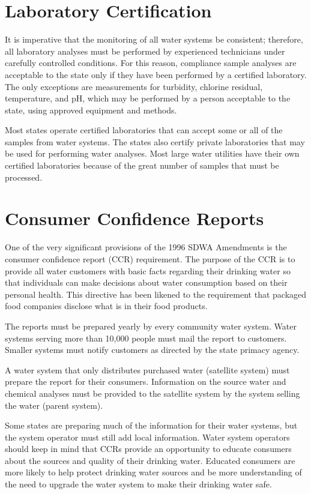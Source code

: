 \documentclass[10pt]{article}
\begin{document}
\section{Laboratory Certification}
It is imperative that the monitoring of all water systems be consistent; therefore, all laboratory analyses must be performed by experienced technicians under carefully controlled conditions. For this reason, compliance sample analyses are acceptable to the state only if they have been performed by a certified laboratory. The only exceptions are measurements for turbidity, chlorine residual, temperature, and $\mathrm{pH}$, which may be performed by a person acceptable to the state, using approved equipment and methods.

Most states operate certified laboratories that can accept some or all of the samples from water systems. The states also certify private laboratories that may be used for performing water analyses. Most large water utilities have their own certified laboratories because of the great number of samples that must be processed.

\section{Consumer Confidence Reports}
One of the very significant provisions of the 1996 SDWA Amendments is the consumer confidence report (CCR) requirement. The purpose of the CCR is to provide all water customers with basic facts regarding their drinking water so that individuals can make decisions about water consumption based on their personal health. This directive has been likened to the requirement that packaged food companies disclose what is in their food products.

The reports must be prepared yearly by every community water system. Water systems serving more than 10,000 people must mail the report to customers. Smaller systems must notify customers as directed by the state primacy agency.

A water system that only distributes purchased water (satellite system) must prepare the report for their consumers. Information on the source water and chemical analyses must be provided to the satellite system by the system selling the water (parent system).

Some states are preparing much of the information for their water systems, but the system operator must still add local information. Water system operators should keep in mind that CCRs provide an opportunity to educate consumers about the sources and quality of their drinking water. Educated consumers are more likely to help protect drinking water sources and be more understanding of the need to upgrade the water system to make their drinking water safe.
\end{document}

